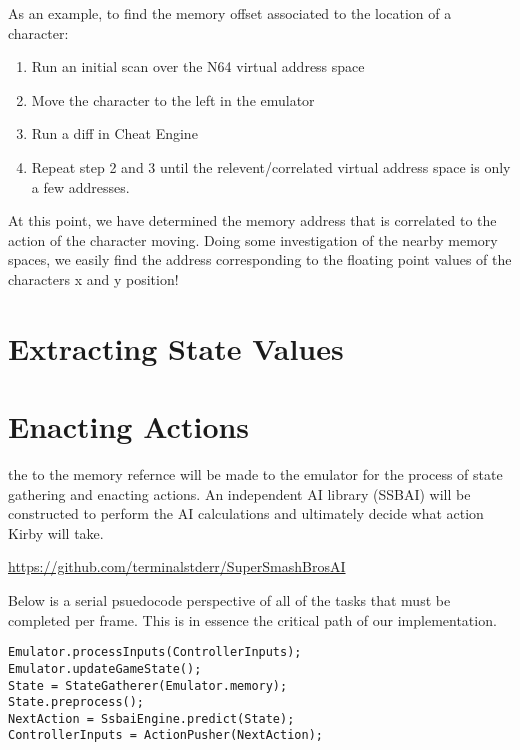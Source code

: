 As an example, to find the memory offset associated to the location of a character:
\begin{enumerate}
\item Run an initial scan over the N64 virtual address space
\item Move the character to the left in the emulator
\item Run a diff in Cheat Engine
\item Repeat step 2 and 3 until the relevent/correlated virtual address space is only a few addresses.
\end{enumerate}
At this point, we have determined the memory address that is correlated to the action of the character moving.
Doing some investigation of the nearby memory spaces, we easily find the address corresponding to the floating point values of the characters x and y position!

\section*{Extracting State Values}

\section*{Enacting Actions}


the to the memory refernce will be made to the emulator for the process of state gathering and enacting actions.
An independent AI library (SSBAI) will be constructed to perform the AI calculations and ultimately decide what action Kirby will take.

\url{https://github.com/terminalstderr/SuperSmashBrosAI}

Below is a serial psuedocode perspective of all of the tasks that must be completed per frame.
This is in essence the critical path of our implementation.
\begin{verbatim}
Emulator.processInputs(ControllerInputs);
Emulator.updateGameState();
State = StateGatherer(Emulator.memory);
State.preprocess();
NextAction = SsbaiEngine.predict(State);
ControllerInputs = ActionPusher(NextAction);
\end{verbatim}

